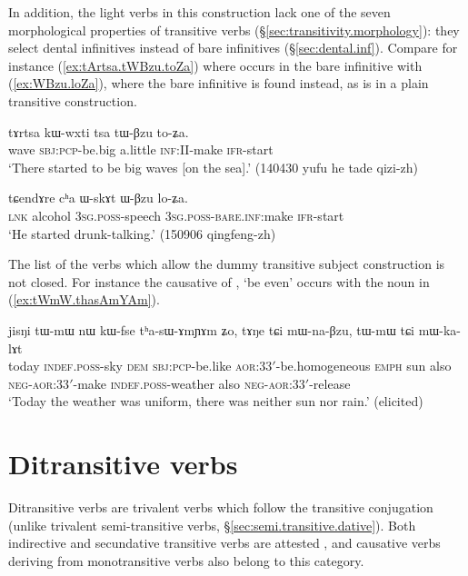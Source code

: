 In addition, the light verbs in this construction lack one of the seven morphological properties of transitive verbs (§\ref{sec:transitivity.morphology}): they select dental infinitives instead of bare infinitives (§\ref{sec:dental.inf}). Compare for instance (\ref{ex:tArtsa.tWBzu.toZa}) where  occurs in the bare infinitive  with (\ref{ex:WBzu.loZa}), where the bare infinitive  is found instead, as  is in a plain transitive construction.

\begin{exe}
\ex \label{ex:tArtsa.tWBzu.toZa}
\gll tɤrtsa kɯ-wxti tsa tɯ-βzu to-ʑa. \\
wave \textsc{sbj}:\textsc{pcp}-be.big a.little \textsc{inf}:II-make \textsc{ifr}-start \\
\glt `There started to be big waves [on the sea].' (140430 yufu he tade qizi-zh)
\end{exe}

\begin{exe}
\ex \label{ex:WBzu.loZa}
\gll tɕendɤre cʰa ɯ-skɤt ɯ-βzu lo-ʑa.  \\
\textsc{lnk} alcohol \textsc{3sg}.\textsc{poss}-speech \textsc{3sg}.\textsc{poss}-\textsc{bare}.\textsc{inf}:make \textsc{ifr}-start \\
\glt `He started drunk-talking.' (150906 qingfeng-zh)
\end{exe}

The list of the verbs which allow the dummy transitive subject construction is not closed. For instance the causative of , `be even' occurs with the noun  in (\ref{ex:tWmW.thasAmYAm}).

\begin{exe}
\ex \label{ex:tWmW.thasAmYAm}
\gll  jisŋi tɯ-mɯ nɯ kɯ-fse tʰa-sɯ-ɤmɲɤm ʑo, tɤŋe tɕi mɯ-na-βzu, tɯ-mɯ tɕi mɯ-ka-lɤt \\
today \textsc{indef}.\textsc{poss}-sky \textsc{dem} \textsc{sbj}:\textsc{pcp}-be.like \textsc{aor}:3\fl{}3$'$-be.homogeneous \textsc{emph} sun also \textsc{neg}-\textsc{aor}:3\fl{}3$'$-make  \textsc{indef}.\textsc{poss}-weather also \textsc{neg}-\textsc{aor}:3\fl{}3$'$-release \\ 
\glt  `Today the weather was uniform, there was neither sun nor rain.' (elicited)
\end{exe}

\section{Ditransitive verbs} \label{sec:ditransitive}
Ditransitive verbs are trivalent verbs which follow the transitive conjugation (unlike trivalent semi-transitive verbs, §\ref{sec:semi.transitive.dative}). Both indirective and secundative transitive verbs are attested \citep{malchukov10ditransitive}, and causative verbs deriving from monotransitive verbs also belong to this category.


